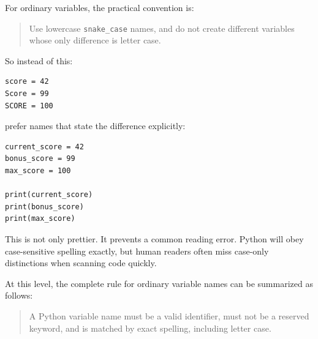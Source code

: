 For ordinary variables, the practical convention is:

\begin{quote}
Use lowercase \texttt{snake\_case} names, and do not create different variables whose only difference is letter case.
\end{quote}

So instead of this:

\begin{verbatim}
score = 42
Score = 99
SCORE = 100
\end{verbatim}

prefer names that state the difference explicitly:

\begin{verbatim}
current_score = 42
bonus_score = 99
max_score = 100

print(current_score)
print(bonus_score)
print(max_score)
\end{verbatim}

This is not only prettier. It prevents a common reading error. Python will obey case-sensitive spelling exactly, but human readers often miss case-only distinctions when scanning code quickly.

At this level, the complete rule for ordinary variable names can be summarized as follows:

\begin{quote}
A Python variable name must be a valid identifier, must not be a reserved keyword, and is matched by exact spelling, including letter case.
\end{quote}